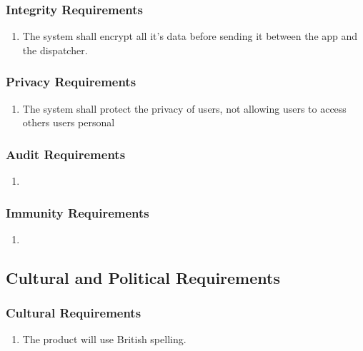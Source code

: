 \documentclass[english]{article}
\begin{document}
\subsubsection{Integrity Requirements}
\label{ssub:integrity_requirements}
\begin{enumerate}[{SIR}1. ]
	\item The system shall encrypt all it's data before sending it between the app and the dispatcher. 
\end{enumerate}

\subsubsection{Privacy Requirements}
\label{ssub:privacy_requirements}
\begin{enumerate}[{SPR}1. ]
	\item The system shall protect the privacy of users, not allowing users to access others users personal
\end{enumerate}

\subsubsection{Audit Requirements}
\label{ssub:audit_requirements}
\begin{enumerate}[{SAUR}1. ]
	\item 
\end{enumerate}

\subsubsection{Immunity Requirements}
\label{ssub:immunity_requirements}
\begin{enumerate}[{SIMR}1. ]
	\item 
\end{enumerate}


\subsection{Cultural and Political Requirements}
\label{sub:cultural_and_political_requirements}

\subsubsection{Cultural Requirements}
\label{ssub:cultural_requirements}
\begin{enumerate}[{CCR}1. ]
	\item The product will use British spelling.
\end{enumerate}
\end{document}
